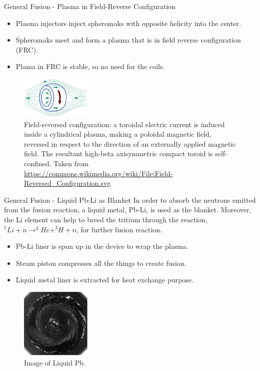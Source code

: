 \begin{frame}{General Fusion - Plasma in Field-Reverse Configuration}
    \begin{itemize}
        \item Plasma injectors inject spheromaks with opposite helicity into the center.
        \item Spheromaks meet and form a plasma that is in field reverse configuration (FRC).
        \item Plama in FRC is stable, so no need for the coils. \cite{LabergeMichel2009ERfa}
    \end{itemize}

    \begin{figure}
        \centering
        \includegraphics[width=0.3\textwidth]{figures/frc.png}
        \caption{Field-reversed configuration: a toroidal electric current is induced inside a cylindrical plasma, making a poloidal magnetic field, reversed in respect to the direction of an externally applied magnetic field. The resultant high-beta axisymmetric compact toroid is self-confined. Taken from \url{https://commons.wikimedia.org/wiki/File:Field-Reversed_Configuration.svg}}
    \end{figure}
\end{frame}

\begin{frame}{General Fusion - Liquid Pb-Li as Blanket}
    In order to absorb the neutrons emitted from the fusion reaction, a liquid metal, Pb-Li, is used as the blanket. Moreover, the Li element can help to breed the tritium through the reaction, $^7Li+n \to ^4He + ^3H + n$, for further fusion reaction. \cite{LabergeMichel2009ERfa}
    \begin{itemize}
        \item Pb-Li liner is spun up in the device to wrap the plasma.
        \item Steam piston compresses all the things to create fusion.
        \item Liquid metal liner is extracted for heat exchange purpose.
    \end{itemize}

    \begin{figure}
        \centering
        \includegraphics[width=0.3\textwidth]{figures/liquid-pb.png}
        \caption{Image of Liquid Pb.}
    \end{figure}
\end{frame}